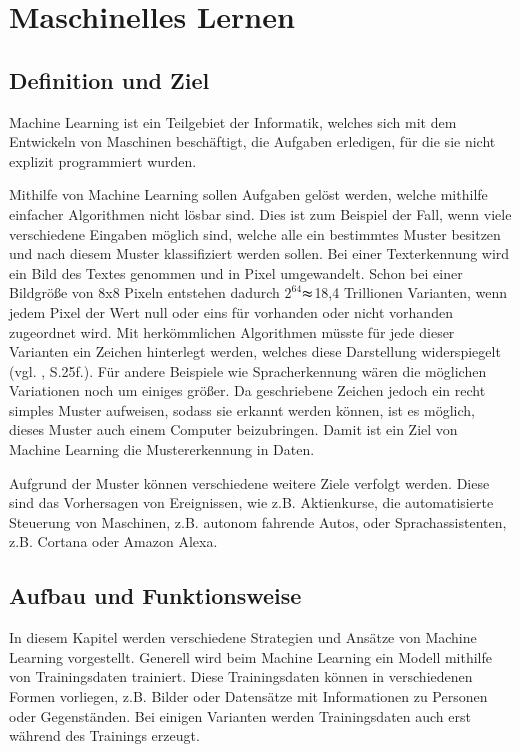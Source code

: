 \chapter{Maschinelles Lernen}
\label{chap:maschinellesLernen}
\chapterauthor{\authorMarco}
\section{Definition und Ziel}
\label{sec:definitionZiel}
Machine Learning ist ein Teilgebiet der Informatik, welches sich mit dem Entwickeln von Maschinen beschäftigt, die Aufgaben erledigen, für die sie nicht explizit programmiert wurden.

Mithilfe von Machine Learning sollen Aufgaben gelöst werden, welche mithilfe einfacher Algorithmen nicht lösbar sind. Dies ist zum Beispiel der Fall, wenn viele verschiedene Eingaben möglich sind, welche alle ein bestimmtes Muster besitzen und nach diesem Muster klassifiziert werden sollen. Bei einer Texterkennung wird ein Bild des Textes genommen und in Pixel umgewandelt. Schon bei einer Bildgröße von 8x8 Pixeln entstehen dadurch $2^{64}$$\thickapprox$18,4 Trillionen Varianten, wenn jedem Pixel der Wert null oder eins für vorhanden oder nicht vorhanden zugeordnet wird. Mit herkömmlichen Algorithmen müsste für jede dieser Varianten ein Zeichen hinterlegt werden, welches diese Darstellung widerspiegelt (vgl. \cite[]{NeuNetze}, S.25f.). Für andere Beispiele wie Spracherkennung wären die möglichen Variationen noch um einiges größer. Da geschriebene Zeichen jedoch ein recht simples Muster aufweisen, sodass sie erkannt werden können, ist es möglich, dieses Muster auch einem Computer beizubringen. Damit ist ein Ziel von Machine Learning die Mustererkennung in Daten.

Aufgrund der Muster können verschiedene weitere Ziele verfolgt werden. Diese sind das Vorhersagen von Ereignissen, wie z.B. Aktienkurse, die automatisierte Steuerung von Maschinen, z.B. autonom fahrende Autos, oder Sprachassistenten, z.B. Cortana oder Amazon Alexa.

\section{Aufbau und Funktionsweise}
\label{sec:aufbauFunktionsweise}
In diesem Kapitel werden verschiedene Strategien und Ansätze von Machine Learning vorgestellt. Generell wird beim Machine Learning ein Modell mithilfe von Trainingsdaten trainiert. Diese Trainingsdaten können in verschiedenen Formen vorliegen, z.B. Bilder oder Datensätze mit Informationen zu Personen oder Gegenständen. Bei einigen Varianten werden Trainingsdaten auch erst während des Trainings erzeugt.


